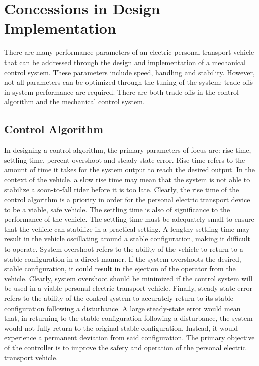 \section{Concessions in Design Implementation} \label{sec:Tradeoff}
There are many performance parameters of an electric personal transport vehicle that can be addressed through the design and implementation of a mechanical control system. 
These parameters include speed, handling and stability. 
However, not all parameters can be optimized through the tuning of the system; trade offs in system performance are required. 
There are both trade-offs in the control algorithm and the mechanical control system.

\subsection{Control Algorithm} 
In designing a control algorithm, the primary parameters of focus are: rise time, settling time, percent overshoot and steady-state error. 
Rise time refers to the amount of time it takes for the system output to reach the desired output. 
In the context of the vehicle, a slow rise time may mean that the system is not able to stabilize a soon-to-fall rider before it is too late. 
Clearly, the rise time of the control algorithm is a priority in order for the personal electric transport device to be a viable, safe vehicle.
The settling time is also of significance to the performance of the vehicle. 
The settling time must be adequately small to ensure that the vehicle can stabilize in a practical setting. 
A lengthy settling time may result in the vehicle oscillating around a stable configuration, making it difficult to operate. 
System overshoot refers to the ability of the vehicle to return to a stable configuration in a direct manner. 
If the system overshoots the desired, stable configuration, it could result in the ejection of the operator from the vehicle. 
Clearly, system overshoot should be minimized if the control system will be used in a viable personal electric transport vehicle. 
Finally, steady-state error refers to the ability of the control system to accurately return to its stable configuration following a disturbance. 
A large steady-state error would mean that, in returning to the stable configuration following a disturbance, the system would not fully return to the original stable configuration. 
Instead, it would experience a permanent deviation from said configuration. 
The primary objective of the controller is to improve the safety and operation of the personal electric transport vehicle. 
